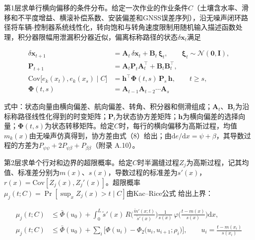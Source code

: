 \documentclass[preprint,12pt,number,sort&compress]{elsarticle}
\begin{document}
第1层求单行横向偏移的条件分布。给定一次作业的作业条件\(C\)（土壤含水率、滑移和不平度增益、横滚补偿系数、安装偏差和GNSS误差序列），沿无噪声闭环路径将车辆-控制器系统线性化，转向饱和与转角速度限制用随机输入描述函数处理\citep{booton1954,kazakov1956}，积分器限幅用泄漏积分器近似，偏离标称路径的状态\(\delta\boldsymbol x_t\)满足

\begin{equation}
\begin{aligned}
\delta\boldsymbol x_{t+1}&=\boldsymbol A_t\,\delta\boldsymbol x_t+\boldsymbol B_t\,\boldsymbol\xi_t,\qquad \boldsymbol\xi_t\sim\mathcal N(\boldsymbol 0,\boldsymbol I),\\
\boldsymbol P_{t+1}&=\boldsymbol A_t\boldsymbol P_t\boldsymbol A_t^{\top}+\boldsymbol B_t\boldsymbol B_t^{\top},\\
\mathrm{Cov}\big[e_k(x_t),e_k(x_s)\mid C\big]&=\boldsymbol h^{\top}\boldsymbol\Phi(t,s)\,\boldsymbol P_s\,\boldsymbol h,\qquad t\ge s,\\
\boldsymbol\Phi(t,s)&=\boldsymbol A_{t-1}\boldsymbol A_{t-2}\cdots\boldsymbol A_s
\end{aligned}
\end{equation}

式中：状态向量由横向偏差、航向偏差、转角、积分器和侧滑组成；\(\boldsymbol A_t\)、\(\boldsymbol B_t\)为沿标称路径线性化得到的时变矩阵；\(\boldsymbol P_t\)为状态协方差矩阵；\(\boldsymbol h\)为横向偏差的选择向量；\(\boldsymbol\Phi(t,s)\)为状态转移矩阵。给定\(C\)时，每行的横向偏移为高斯过程，均值\(m_k(x)\)由无噪声仿真得到，协方差由式（8）给出；由\(\mathrm de/\mathrm dx=\psi+\beta\)，其导数过程的方差为\(P_{\psi\psi}+2P_{\psi\beta}+P_{\beta\beta}\)（附录 A.10）。

第2层求单个行对和边界的超限概率。给定\(C\)时半漏缝过程\(Z_j\)为高斯过程，记其均值、标准差分别为\(m(x)\)、\(s(x)\)，导数过程的标准差为\(s'(x)\)，\(r(x)=\mathrm{Cov}[Z_j(x),Z_j'(x)]\)。超限概率\(\mu_j(t;C)=\Pr[\sup_xZ_j(x)>t\mid C]\)由Kac--Rice公式\citep{azais2009,piterbarg1996} 给出上界：

\begin{equation}
\begin{aligned}
\mu_j(t;C)&\le\bar\Phi(u_0)+\int_0^{L}\tilde s'(x)\,R\Big(\frac{\tilde m'(x;t)}{\tilde s'(x)}\Big)\frac{1}{s(x)}\,\varphi\Big(\frac{t-m(x)}{s(x)}\Big)\mathrm dx,\\
\mu_j(t;C)&\le\bar\Phi(u_0)+\sum_{i}\Big[\Phi(u_i)-\Phi_2\big(u_i,u_{i+1};\rho_i\big)\Big],\qquad u_i=\frac{t-m(x_i)}{s(x_i)}
\end{aligned}
\end{equation}
\end{document}
